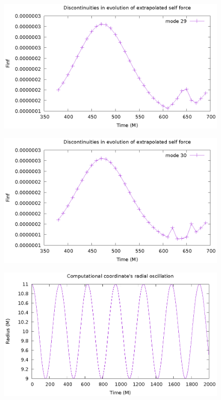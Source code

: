 \documentclass{article}
\begin{document}
\begin{figure}
\includegraphics{finfOverTimeL29}
\end{figure}
\begin{figure}
\includegraphics{finfOverTimeL30}
\end{figure}

\begin{figure}
\includegraphics{orbit}
\end{figure}
\end{document}
